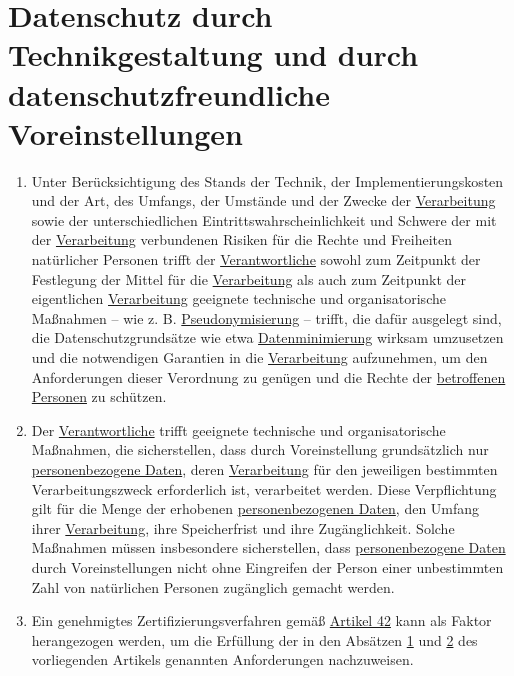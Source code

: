 \chapter{Datenschutz durch Technikgestaltung und durch datenschutzfreundliche Voreinstellungen}
\label{ch:25}


\begin{enumerate}

  \item Unter Berücksichtigung des Stands der Technik, der Implementierungskosten und der Art, des Umfangs, der Umstände
   und der Zwecke der \hyperref[itm:04-2]{Verarbeitung} sowie der unterschiedlichen Eintrittswahrscheinlichkeit und
   Schwere der mit der
   \hyperref[itm:04-2]{Verarbeitung} verbundenen Risiken für die Rechte und Freiheiten natürlicher Personen trifft
    der \hyperref[itm:04-7]{Verantwortliche} sowohl zum Zeitpunkt der Festlegung der Mittel für die \hyperref[itm:04-2]
    {Verarbeitung} als auch zum Zeitpunkt der eigentlichen
   \hyperref[itm:04-2]{Verarbeitung} geeignete technische und organisatorische Maßnahmen -- wie z. B. \hyperref
    [itm:04-5]{Pseudonymisierung} -- trifft, die dafür ausgelegt sind, die Datenschutzgrundsätze wie etwa
    \hyperref[itm:05-1c]{Datenminimierung} wirksam umzusetzen und die notwendigen Garantien in die \hyperref[itm:04-2]
     {Verarbeitung} aufzunehmen, um den Anforderungen dieser Verordnung zu genügen und die Rechte der \hyperref
     [itm:04-1]{betroffenen Personen} zu schützen.
  \label{itm:25-1}

  \item Der \hyperref[itm:04-7]{Verantwortliche} trifft geeignete technische und organisatorische Maßnahmen, die
   sicherstellen, dass durch Voreinstellung grundsätzlich nur \hyperref[itm:04-1]{personenbezogene Daten},
   deren \hyperref[itm:04-2]{Verarbeitung} für den jeweiligen bestimmten Verarbeitungszweck erforderlich ist,
   verarbeitet werden. Diese Verpflichtung gilt für die Menge der erhobenen
   \hyperref[itm:04-1]{personenbezogenen Daten}, den Umfang ihrer \hyperref[itm:04-2]{Verarbeitung}, ihre Speicherfrist
    und ihre Zugänglichkeit. Solche Maßnahmen müssen insbesondere sicherstellen, dass \hyperref[itm:04-1]
    {personenbezogene Daten} durch Voreinstellungen nicht ohne Eingreifen der Person einer unbestimmten Zahl von
    natürlichen Personen zugänglich gemacht werden.
  \label{itm:25-2}

  \item Ein genehmigtes Zertifizierungsverfahren gemäß \hyperref[ch:42]{Artikel 42} kann als Faktor herangezogen werden,
   um die Erfüllung der in den Absätzen \hyperref[itm:25-1]{1} und \hyperref[itm:25-2]{2} des vorliegenden Artikels
   genannten Anforderungen nachzuweisen.
  \label{itm:25-3}

\end{enumerate}


